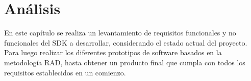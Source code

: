 \newpage
\chapter{Análisis}
En este capítulo se realiza un levantamiento de requisitos funcionales y no funcionales del SDK a desarrollar, considerando el estado actual del proyecto. Para luego realizar los diferentes prototipos de software basados en la metodología RAD, hasta obtener un producto final que cumpla con todos los requisitos establecidos en un comienzo. 